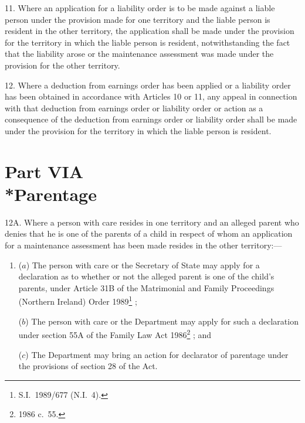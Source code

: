 \documentclass[12pt,a4paper]{article}
\begin{document}
\medskip

11.   Where an application for a liability order is to be made against a liable person under the provision made for one territory and the liable person is resident in the other territory, the application shall be made under the provision for the territory in which the liable person is resident, notwithstanding the fact that the liability arose or the maintenance assessment was made under the provision for the other territory.

\medskip

12.   Where a deduction from earnings order has been applied or a liability order has been obtained in accordance with Articles 10 or 11, any appeal in connection with that deduction from earnings order or liability order or action as a consequence of the deduction from earnings order or liability order shall be made under the provision for the territory in which the liable person is resident.

\section[Part VIA --- Parentage]{Part VIA\\*Parentage}

\renewcommand\parthead{--- Schedule 1 Part VIA}

12A.  Where a person with care resides in one territory and an alleged parent who denies that he is one of the parents of a child in respect of whom an application for a maintenance assessment has been made resides in the other territory:—
\begin{enumerate}\item[]
($a$) The person with care or the Secretary of State may apply for a declaration as to whether or not the alleged parent is one of the child’s parents, under
Article 31B of the Matrimonial and Family Proceedings (Northern Ireland) Order 1989\footnote{S.I.\ 1989/677 (N.I.\ 4).}%
;

($b$) The person with care or the Department 
may apply for such a declaration under 
section 55A of the Family Law Act 1986\footnote{1986 c.\ 55.}%
; and

($c$) The Department 
may bring an action for declarator of parentage under the provisions of section 28 of the Act.
\end{enumerate}
\end{document}
